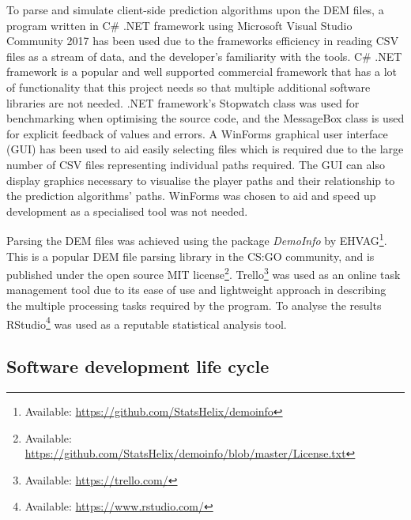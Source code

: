 \documentclass[journal]{IEEEtran}
\begin{document}
To parse and simulate client-side prediction algorithms upon the DEM files, a program written in C\# .NET framework using Microsoft Visual Studio Community 2017 has been used due to the frameworks efficiency in reading CSV files as a stream of data, and the developer's familiarity with the tools. C\# .NET framework is a popular and well supported commercial framework that has a lot of functionality that this project needs so that multiple additional software libraries are not needed. .NET framework's Stopwatch class was used for benchmarking when optimising the source code, and the MessageBox class is used for explicit feedback of values and errors. A WinForms graphical user interface (GUI) has been used to aid easily selecting files which is required due to the large number of CSV files representing individual paths required. The GUI can also display graphics necessary to visualise the player paths and their relationship to the prediction algorithms' paths. WinForms was chosen to aid and speed up development as a specialised tool was not needed.

Parsing the DEM files was achieved using the package \textit{DemoInfo} by EHVAG\footnote[3]{Available: \url{https://github.com/StatsHelix/demoinfo}}. This is a popular DEM file parsing library in the CS:GO community, and is published under the open source MIT license\footnote[4]{Available: \url{https://github.com/StatsHelix/demoinfo/blob/master/License.txt}}. Trello\footnote[5]{Available: \url{https://trello.com/}} was used as an online task management tool due to its ease of use and lightweight approach in describing the multiple processing tasks required by the program. To analyse the results RStudio\footnote[6]{Available: \url{https://www.rstudio.com/}} was used as a reputable statistical analysis tool.

\subsection{Software development life cycle} \label{lifecycle}
\end{document}
